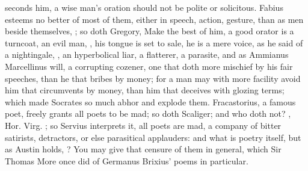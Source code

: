 seconds him, a wise man's oration should not be polite or solicitous.
Fabius esteems no better of most of them, either in speech,
action, gesture, than as men beside themselves, ; so
doth Gregory,  Make the
best of him, a good orator is a turncoat, an evil man, , his tongue is set to sale, he is a mere voice, as
he said of a nightingale, , an
hyperbolical liar, a flatterer, a parasite, and as Ammianus
Marcellinus will, a corrupting cozener, one that doth more mischief by his fair
speeches, than he that bribes by money; for a man may with more facility avoid
him that circumvents by money, than him that deceives with glozing terms; which
made Socrates so much abhor and explode them.
Fracastorius, a famous poet, freely grants all poets to be
mad; so doth Scaliger; and who doth not? , Hor.
  Virg. ; so Servius interprets it, all
poets are mad, a company of bitter satirists, detractors, or else parasitical
applauders: and what is poetry itself, but as Austin holds, ? You may give that censure of them in general,
which Sir Thomas More once did of Germanus Brixius' poems in particular.


